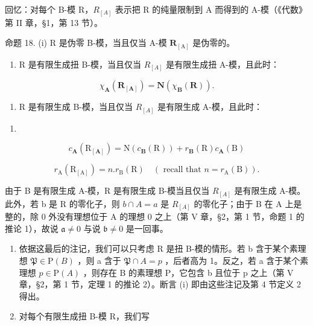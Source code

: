 回忆：对每个 B-模 R，\(R_{[A]}\) 表示把 R 的纯量限制到 A 而得到的 A-模（《代数》第 II 章，§1，第 13 节）。

命题 18. (i) R 是伪零 B-模，当且仅当 A-模 \(\mathbf{R}_{[\mathrm{A}]}\) 是伪零的。

\begin{enumerate}
\def\labelenumi{(\roman{enumi})}
\setcounter{enumi}{1}
\tightlist
\item
  R 是有限生成扭 B-模，当且仅当 \(R_{[A]}\) 是有限生成扭 A-模，且此时：
\end{enumerate}

\[
\chi_ {\mathbf {A}} (\mathbf {R} _ {[ \mathbf {A} ]}) = \mathbf {N} (\chi_ {\mathbf {B}} (\mathbf {R})).\tag{19}
\]

\begin{enumerate}
\def\labelenumi{(\roman{enumi})}
\setcounter{enumi}{2}
\tightlist
\item
  R 是有限生成 B-模，当且仅当 \(R_{[A]}\) 是有限生成 A-模，且此时：
\end{enumerate}

\begin{enumerate}
\def\labelenumi{(\arabic{enumi})}
\setcounter{enumi}{19}
\tightlist
\item
\end{enumerate}

\[
c _ {\mathbf {A}} (\mathrm{R} _ {[ \mathbf {A} ]}) = \mathrm{N} (c _ {\mathbf {B}} (\mathrm{R})) + r _ {\mathbf {B}} (\mathrm{R}) c _ {\mathbf {A}} (\mathrm{B})\tag{21}
\]

\[
r _ {\mathrm{A}} (\mathrm{R} _ {[ \mathrm{A} ]}) = n. r _ {\mathrm{B}} (\mathrm{R}) \quad (\text { recall   that } n = r _ {\mathrm{A}} (\mathrm{B})).
\]

由于 B 是有限生成 A-模，R 是有限生成 B-模当且仅当 \(R_{[A]}\) 是有限生成 A-模。此外，若 b 是 R 的零化子，则 \(b \cap A = a\) 是 \(R_{[A]}\) 的零化子；由于 B 在 A 上是整的，除 0 外没有理想位于 A 的理想 0 之上（第 V 章，§2，第 1 节，命题 1 的推论 1），故说 \(\mathfrak{a} \neq 0\) 与说 \(\mathfrak{b} \neq 0\) 是一回事。

\begin{enumerate}
\def\labelenumi{(\roman{enumi})}
\item
  依据这最后的注记，我们可以只考虑 R 是扭 B-模的情形。若 b 含于某个素理想 \(\mathfrak{P} \in \mathrm{P}(B)\) ，则 a 含于 \(\mathfrak{P} \cap A = p\) ，后者高为 1。反之，若 a 含于某个素理想 \(p \in \mathrm{P}(A)\) ，则存在 B 的素理想 P，它包含 b 且位于 p 之上（第 V 章，§2，第 1 节，定理 1 的推论 2）。断言 (i) 即由这些注记及第 4 节定义 2 得出。
\item
  对每个有限生成扭 B-模 R，我们写
\end{enumerate}

